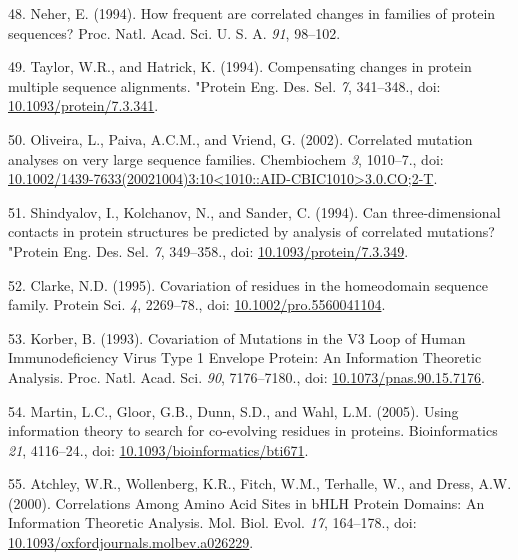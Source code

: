 \documentclass[11pt,a4paper,twoside]{book}
\theoremstyle{definition}
\theoremstyle{definition}
\theoremstyle{remark}
\begin{document}
\hypertarget{ref-Neher1994}{}
48. Neher, E. (1994). How frequent are correlated changes in families of
protein sequences? Proc. Natl. Acad. Sci. U. S. A. \emph{91}, 98--102.

\hypertarget{ref-Taylor1994}{}
49. Taylor, W.R., and Hatrick, K. (1994). Compensating changes in
protein multiple sequence alignments. "Protein Eng. Des. Sel. \emph{7},
341--348., doi:
\href{https://doi.org/10.1093/protein/7.3.341}{10.1093/protein/7.3.341}.

\hypertarget{ref-Oliveira2002}{}
50. Oliveira, L., Paiva, A.C.M., and Vriend, G. (2002). Correlated
mutation analyses on very large sequence families. Chembiochem \emph{3},
1010--7., doi:
\href{https://doi.org/10.1002/1439-7633(20021004)3:10\%3C1010::AID-CBIC1010\%3E3.0.CO;2-T}{10.1002/1439-7633(20021004)3:10\textless{}1010::AID-CBIC1010\textgreater{}3.0.CO;2-T}.

\hypertarget{ref-Shindyalov1994}{}
51. Shindyalov, I., Kolchanov, N., and Sander, C. (1994). Can
three-dimensional contacts in protein structures be predicted by
analysis of correlated mutations? "Protein Eng. Des. Sel. \emph{7},
349--358., doi:
\href{https://doi.org/10.1093/protein/7.3.349}{10.1093/protein/7.3.349}.

\hypertarget{ref-Clarke1995}{}
52. Clarke, N.D. (1995). Covariation of residues in the homeodomain
sequence family. Protein Sci. \emph{4}, 2269--78., doi:
\href{https://doi.org/10.1002/pro.5560041104}{10.1002/pro.5560041104}.

\hypertarget{ref-Korber1993}{}
53. Korber, B. (1993). Covariation of Mutations in the V3 Loop of Human
Immunodeficiency Virus Type 1 Envelope Protein: An Information Theoretic
Analysis. Proc. Natl. Acad. Sci. \emph{90}, 7176--7180., doi:
\href{https://doi.org/10.1073/pnas.90.15.7176}{10.1073/pnas.90.15.7176}.

\hypertarget{ref-Martin2005}{}
54. Martin, L.C., Gloor, G.B., Dunn, S.D., and Wahl, L.M. (2005). Using
information theory to search for co-evolving residues in proteins.
Bioinformatics \emph{21}, 4116--24., doi:
\href{https://doi.org/10.1093/bioinformatics/bti671}{10.1093/bioinformatics/bti671}.

\hypertarget{ref-Atchley2000}{}
55. Atchley, W.R., Wollenberg, K.R., Fitch, W.M., Terhalle, W., and
Dress, A.W. (2000). Correlations Among Amino Acid Sites in bHLH Protein
Domains: An Information Theoretic Analysis. Mol. Biol. Evol. \emph{17},
164--178., doi:
\href{https://doi.org/10.1093/oxfordjournals.molbev.a026229}{10.1093/oxfordjournals.molbev.a026229}.
\end{document}
